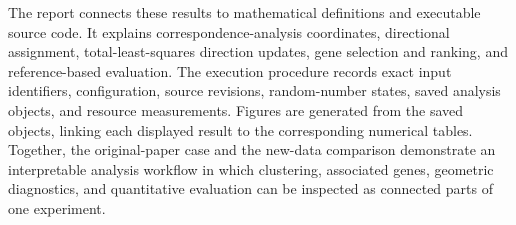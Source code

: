 The report connects these results to mathematical definitions and executable source code. It explains correspondence-analysis coordinates, directional assignment, total-least-squares direction updates, gene selection and ranking, and reference-based evaluation. The execution procedure records exact input identifiers, configuration, source revisions, random-number states, saved analysis objects, and resource measurements. Figures are generated from the saved objects, linking each displayed result to the corresponding numerical tables. Together, the original-paper case and the new-data comparison demonstrate an interpretable analysis workflow in which clustering, associated genes, geometric diagnostics, and quantitative evaluation can be inspected as connected parts of one experiment.
\par
